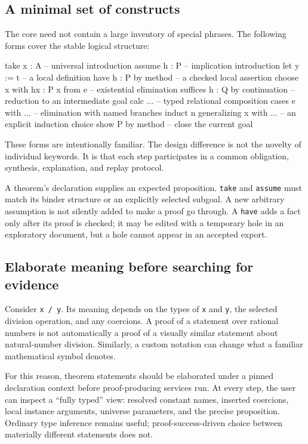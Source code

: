 \documentclass[11pt,a4paper]{article}
\theoremstyle{remark}
\newcommand{\ty}[1]{\texttt{#1}}
\begin{document}
\subsection{A minimal set of constructs}
The core need not contain a large inventory of special phrases. The following forms cover the stable logical structure:
\Needspace{142pt}
\begin{code}
take x : A                       -- universal introduction
assume h : P                     -- implication introduction
let y := t                       -- a local definition
have h : P by method             -- a checked local assertion
choose x with hx : P x from e    -- existential elimination
suffices h : Q by continuation   -- reduction to an intermediate goal
calc ...                         -- typed relational composition
cases e with ...                 -- elimination with named branches
induct n generalizing x with ... -- an explicit induction choice
show P by method                 -- close the current goal
\end{code}
These forms are intentionally familiar. The design difference is not the novelty of individual keywords. It is that each step participates in a common obligation, synthesis, explanation, and replay protocol.

A theorem's declaration supplies an expected proposition. \ty{take} and \ty{assume} must match its binder structure or an explicitly selected subgoal. A new arbitrary assumption is not silently added to make a proof go through. A \ty{have} adds a fact only after its proof is checked; it may be edited with a temporary hole in an exploratory document, but a hole cannot appear in an accepted export.

\subsection{Elaborate meaning before searching for evidence}
Consider \ty{x / y}. Its meaning depends on the types of \ty{x} and \ty{y}, the selected division operation, and any coercions. A proof of a statement over rational numbers is not automatically a proof of a visually similar statement about natural-number division. Similarly, a custom notation can change what a familiar mathematical symbol denotes.

For this reason, theorem statements should be elaborated under a pinned declaration context before proof-producing services run. At every step, the user can inspect a ``fully typed'' view: resolved constant names, inserted coercions, local instance arguments, universe parameters, and the precise proposition. Ordinary type inference remains useful; proof-success-driven choice between materially different statements does not.
\end{document}
